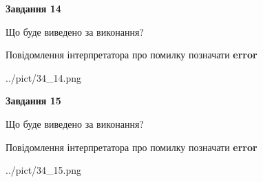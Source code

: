 \documentclass[11pt, ukrainian]{article}
\begin{document}
{\begin {large}
{\begin {center}\textbf{Завдання 14}\end {center}}\par
Що буде виведено за виконання? \par
Повідомлення інтерпретатора про помилку позначати \textbf{error}

\begin{center}
	{../pict/34_14.png}
\end{center}
\newpage

{\begin {center}\textbf{Завдання 15}\end {center}}\par
Що буде виведено за виконання? \par
Повідомлення інтерпретатора про помилку позначати \textbf{error}

\begin{center}
	{../pict/34_15.png}
\end{center}
\newpage

\end {large}}
\end{document}
